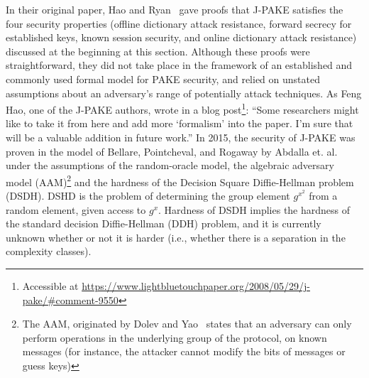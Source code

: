  In their original paper, Hao and Ryan~\cite{HaRy2010} gave proofs that J-PAKE satisfies the four security properties 
 (offline dictionary attack resistance, forward secrecy for established keys, known session security, and online dictionary attack resistance) 
discussed at the beginning at this section.  Although these proofs were straightforward, they did not take place in the framework of an established
and commonly used formal model for PAKE security, and relied on unstated assumptions about an adversary's range of potentially attack 
techniques.  As Feng Hao, one of the J-PAKE authors, wrote in a blog post\footnote{Accessible at 
\url{https://www.lightbluetouchpaper.org/2008/05/29/j-pake/\#comment-9550}}:
``Some researchers might like to take it from here and add more `formalism' into the paper.  I'm sure that will be a valuable addition in future work.''
In 2015, the security of J-PAKE was proven in the model of Bellare, Pointcheval, and Rogaway by Abdalla et. al.~\cite{AbdBenMac15} under the
assumptions of the random-oracle model, the algebraic adversary model (AAM)\footnote{The AAM, originated by Dolev and Yao~\cite{DoYa83} states that an adversary can only perform operations in the underlying group of the protocol, on known messages (for instance, the attacker cannot modify the bits of messages or guess keys)} and the hardness of the Decision Square Diffie-Hellman problem (DSDH). DSHD is the problem of determining the group element $g^{x^2}$ from a random element, given access to $g^x$. Hardness of DSDH implies the hardness of the standard decision Diffie-Hellman (DDH) problem, and it is currently unknown whether or not it is harder (i.e., whether there is a separation in the complexity classes).  



